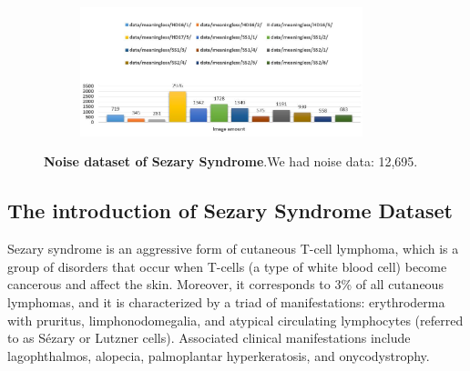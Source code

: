 \begin{figure}[h]
	\begin{center}
		\begin{subfigure}[b]{\textwidth}
		    \centering
			\includegraphics[width=0.9\textwidth]{thesis-template-master/images/noiseofSezarySyndrome.JPG}
			\label{fig:cellnet}
		\end{subfigure}
	\end{center}
	\caption{\textbf{Noise dataset of Sezary Syndrome}.We had noise data: 12,695.}
\end{figure}

\subsection{The introduction of Sezary Syndrome Dataset}
Sezary syndrome is an aggressive form of cutaneous T-cell lymphoma, which is a group of disorders that occur when T-cells (a type of white blood cell) become cancerous and affect the skin\cite{Alain}. Moreover, it corresponds to 3\% of all cutaneous lymphomas, and it is characterized by a triad of manifestations: erythroderma with pruritus, limphonodomegalia, and atypical circulating lymphocytes (referred to as Sézary or Lutzner cells). Associated clinical manifestations include lagophthalmos, alopecia, palmoplantar hyperkeratosis, and onycodystrophy.\cite{Yamashita}


